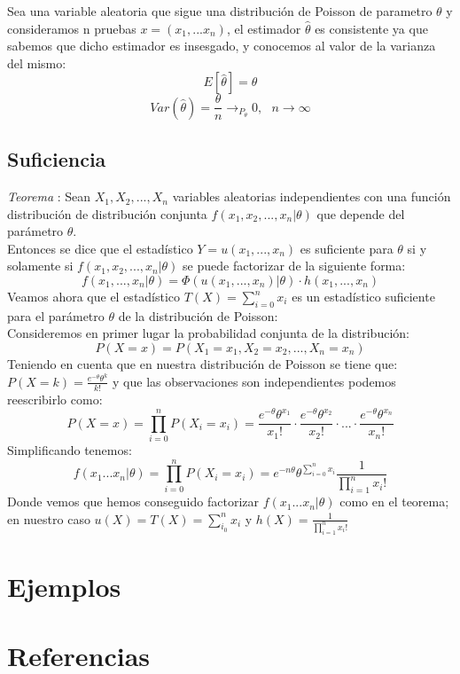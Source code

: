 \documentclass[a4paper, 10pt]{article} %
\newcounter{teo}
\begin{document}
Sea una variable aleatoria que sigue una distribución de Poisson de parametro $\theta$ y consideramos n pruebas $x=(x_1,...x_n)$, el estimador $\hat{\theta}$ es consistente ya que sabemos que dicho estimador es insesgado, y conocemos al valor de la varianza del mismo:
$$E[\hat{\theta}]=\theta$$
$$Var(\hat{\theta})=\frac{\theta}{n} \rightarrow_{P_\theta} 0, \ \ \ n\rightarrow \infty$$
\subsection{Suficiencia}
\addtocounter{teo}{1}
\emph{Teorema }: Sean $X_1, X_2, ..., X_n$ variables aleatorias independientes con una función distribución de distribución conjunta $f(x_1, x_2, ..., x_n | \theta)$ que depende del parámetro $\theta$. \\
Entonces se dice que el estadístico $Y = u(x_1, ..., x_n)$ es suficiente para $\theta$ si y solamente si $f(x_1, x_2, ..., x_n | \theta)$ se puede factorizar de la siguiente forma: \\
$$ f(x_1,...,x_n| \theta) = \Phi(u(x_1, ..., x_n) | \theta)\cdot h(x_1, ..., x_n) $$
Veamos ahora que el estadístico \(T(X) = \sum_{i=0}^n x_i\) es un estadístico suficiente para el parámetro $\theta$ de la distribución de Poisson: \\
Consideremos en primer lugar la probabilidad conjunta de la distribución:
$$P(X=x) = P(X_1 = x_1, X_2 = x_2, ..., X_n = x_n) $$
Teniendo en cuenta que en nuestra distribución de Poisson se tiene que: \(P(X=k) = \frac{e^{-\theta }\theta ^{k}}{k!}\) y que las observaciones son independientes podemos reescribirlo como:
$$P(X=x) = \prod_{i=0}^nP(X_i = x_i) = \frac{e^{-\theta }\theta ^{x_1}}{x_1!}\cdot \frac{e^{-\theta }\theta ^{x_2}}{x_2!}\cdot ... \cdot \frac{e^{-\theta }\theta ^{x_n}}{x_n!}$$
Simplificando tenemos:
$$f(x_1...x_n | \theta) = \prod_{i=0}^nP(X_i = x_i) = e^{-n\theta }\theta ^{\sum_{i=0}^nx_i} \frac{1}{\prod_{i=1}^nx_i!}$$
Donde vemos que hemos conseguido factorizar $f(x_1...x_n | \theta)$ como en el teorema; en nuestro caso $u(X) = T(X) = \sum_{i_0}^n x_i$ y $h(X) =  \frac{1}{\prod_{i=1}^nx_i!}$

\section{Ejemplos}
\section{Referencias}
\end{document}
